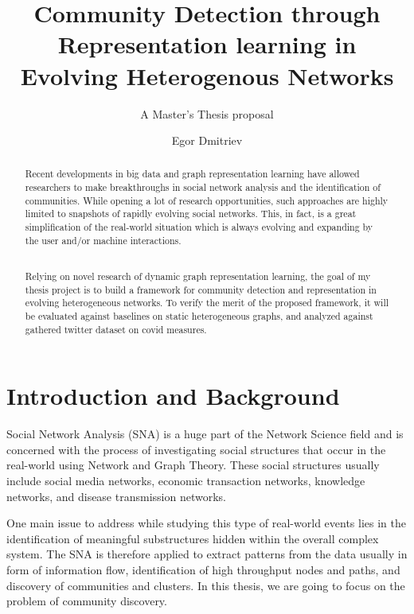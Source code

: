\documentclass[
acmsmall,
nonacm,
screen,
acmthm]{../../scripts/pandoc/templates/acmart}
\title{Community Detection through Representation learning in Evolving
Heterogenous Networks}
\subtitle{A Master's Thesis proposal}
\author{Egor Dmitriev}
\affiliation{%
  \institution{Utrecht University}
  \country{The Netherlands}
}
\date{}
\begin{document}
\begin{abstract}
Recent developments in big data and graph representation learning have
allowed researchers to make breakthroughs in social network analysis and
the identification of communities. While opening a lot of research
opportunities, such approaches are highly limited to snapshots of
rapidly evolving social networks. This, in fact, is a great
simplification of the real-world situation which is always evolving and
expanding by the user and/or machine interactions.\\
\strut \\
Relying on novel research of dynamic graph representation learning, the
goal of my thesis project is to build a framework for community
detection and representation in evolving heterogeneous networks. To
verify the merit of the proposed framework, it will be evaluated against
baselines on static heterogeneous graphs, and analyzed against gathered
twitter dataset on covid measures.
\end{abstract}
\maketitle



{
\setcounter{tocdepth}{2}
\tableofcontents
\pagebreak
}





\hypertarget{introduction-and-background}{%
\section{Introduction and
Background}\label{introduction-and-background}}

Social Network Analysis (SNA) is a huge part of the Network Science
field and is concerned with the process of investigating social
structures that occur in the real-world using Network and Graph Theory.
These social structures usually include social media networks, economic
transaction networks, knowledge networks, and disease transmission
networks.

One main issue to address while studying this type of real-world events
lies in the identification of meaningful substructures hidden within the
overall complex system. The SNA is therefore applied to extract patterns
from the data usually in form of information flow, identification of
high throughput nodes and paths, and discovery of communities and
clusters. In this thesis, we are going to focus on the problem of
community discovery.
\end{document}
